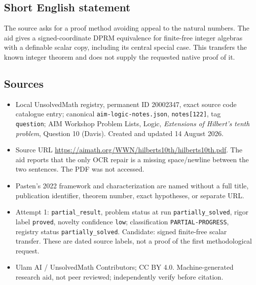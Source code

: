 \documentclass[11pt]{article}
\begin{document}
\subsection{Short English statement}
The source asks for a proof method avoiding appeal to the natural numbers. The aid gives a signed-coordinate DPRM equivalence for finite-free integer algebras with a definable scalar copy, including its central special case. This transfers the known integer theorem and does not supply the requested native proof of it.
\subsection{Sources}
\begin{itemize}
\item Local UnsolvedMath registry, permanent ID 20002347, exact source code catalogue entry; canonical \texttt{aim-logic-notes.json}, \texttt{notes[122]}, tag \texttt{question}; AIM Workshop Problem Lists, Logic, \emph{Extensions of Hilbert's tenth problem}, Question 10 (Davis). Created and updated 14 August 2026.
\item Source URL \url{https://aimath.org/WWN/hilberts10th/hilberts10th.pdf}. The aid reports that the only OCR repair is a missing space/newline between the two sentences. The PDF was not accessed.
\item Pasten's 2022 framework and characterization are named without a full title, publication identifier, theorem number, exact hypotheses, or separate URL.
\item Attempt 1: \texttt{partial\_result}, problem status at run \texttt{partially\_solved}, rigor label \texttt{proved}, novelty confidence \texttt{low}; classification \texttt{PARTIAL-PROGRESS}, registry status \texttt{partially\_solved}. Candidate: signed finite-free scalar transfer. These are dated source labels, not a proof of the first methodological request.
\item Ulam AI / UnsolvedMath Contributors; CC BY 4.0. Machine-generated research aid, not peer reviewed; independently verify before citation.
\end{itemize}
\end{document}
